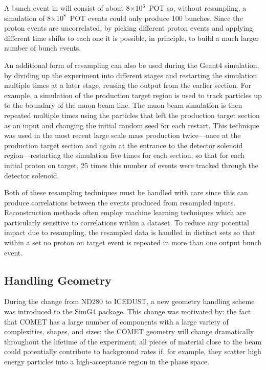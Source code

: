 A bunch event in \phaseI will consist of about 8$\times10^{6}$~\ac{POT} so, without resampling, a simulation of 8$\times10^{8}$~\ac{POT} events could only produce 100 bunches.
Since the proton events are uncorrelated, by picking different proton events and applying different time shifts to each one it is possible, in principle, to build a much larger number of bunch events.

An additional form of resampling can also be used during the Geant4 simulation, by dividing up the experiment into different stages and restarting the simulation multiple times at a later stage, reusing the output from the earlier section.
For example, a simulation of the production target region is used to track particles up to the boundary of the muon beam line.
The muon beam simulation is then repeated multiple times using the particles that left the production target section as an input and changing the initial random seed for each restart.
This technique was used in the most recent large scale mass production twice---once at the production target section and again at the entrance to the detector solenoid region---restarting the simulation five times for each section, so that for each initial proton on target, 25 times this number of events were tracked through the detector solenoid.

Both of these resampling techniques must be handled with care since this can produce correlations between the events produced from resampled inputs.
Reconstruction methods often employ machine learning techniques which are particularly sensitive to correlations within a dataset.
To reduce any potential impact due to resampling, the resampled data is handled in distinct sets so that within a set no proton on target event is repeated in more than one output bunch event.

\subsection{Handling Geometry}
During the change from ND280 to ICEDUST, a new geometry handling scheme was introduced to the SimG4 package.
This change was motivated by: 
    the fact that COMET has a large number of components with a large variety of complexities, shapes, and sizes;
    the COMET geometry will change dramatically throughout the lifetime of the experiment;
    all pieces of material close to the beam could potentially contribute to background rates if, for example, they scatter high energy particles into a high-acceptance region in the phase space.

